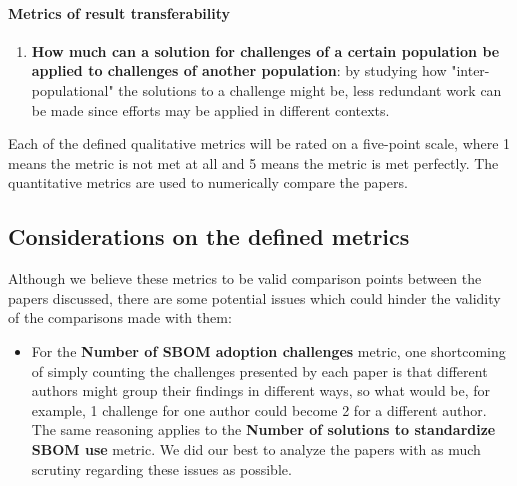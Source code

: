 \paragraph{Metrics of result transferability}
\begin{enumerate}
    \setcounter{enumi}{\value{metrics}}
    \item \textbf{How much can a solution for challenges of a certain population be applied to challenges of another population}: by studying how "inter-populational" the solutions to a challenge might be, less redundant work can be made since efforts may be applied in different contexts.
\end{enumerate}

Each of the defined qualitative metrics will be rated on a five-point scale, where 1 means the metric is not met at all and 5 means the metric is met perfectly. The quantitative metrics are used to numerically compare the papers.

\subsection{Considerations on the defined metrics}

\noindent Although we believe these metrics to be valid comparison points between the papers discussed, there are some potential issues which could hinder the validity of the comparisons made with them:
\begin{itemize}
    \item For the \textbf{Number of SBOM adoption challenges} metric, one shortcoming of simply counting the challenges presented by each paper is that different authors might group their findings in different ways, so what would be, for example, 1 challenge for one author could become 2 for a different author. The same reasoning applies to the \textbf{Number of solutions to standardize SBOM use} metric. We did our best to analyze the papers with as much scrutiny regarding these issues as possible.
\end{itemize}